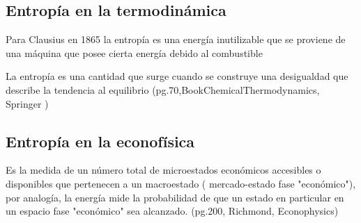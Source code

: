 \subsection{Entropía en la termodinámica} 

Para Clausius en 1865 la entropía es una energía inutilizable que se proviene de una máquina que posee cierta energía debido al combustible

La entropía es una cantidad que surge cuando se construye una desigualdad que describe la tendencia al equilibrio (pg.70,BookChemicalThermodynamics, Springer )



\subsection{Entropía en la econofísica} 

Es la medida de un número total de microestados económicos accesibles o disponibles que pertenecen a un macroestado ( mercado-estado fase "económico"), por analogía, la energía mide la probabilidad de que un estado en particular en un espacio fase "económico" sea alcanzado. (pg.200, Richmond, Econophysics)

